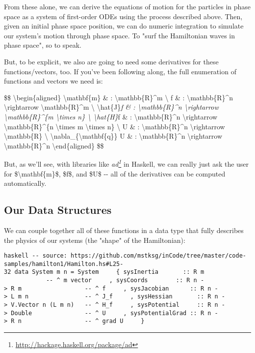 \documentclass[]{article}
\renewcommand{\href}[2]{#2\footnote{\url{#1}}}
\begin{document}
From these alone, we can derive the equations of motion for the particles in
phase space as a system of first-order ODEs using the process described above.
Then, given an initial phase space position, we can do numeric integration to
simulate our system's motion through phase space. To "surf the Hamiltonian waves
in phase space", so to speak.

But, to be explicit, we also are going to need some derivatives for these
functions/vectors, too. If you've been following along, the full enumeration of
functions and vectors we need is:

\$\$ \textbackslash{}begin\{aligned\} \textbackslash{}mathbf\{m\} \& :
\textbackslash{}mathbb\{R\}\^{}m \textbackslash{} f \& :
\textbackslash{}mathbb\{R\}\^{}n \textbackslash{}rightarrow
\textbackslash{}mathbb\{R\}\^{}m \textbackslash{}
\textbackslash{}hat\{J\}\emph{f \& : \textbackslash{}mathbb\{R\}\^{}n
\textbackslash{}rightarrow \textbackslash{}mathbb\{R\}\^{}\{m
\textbackslash{}times n\} \textbackslash{} \textbackslash{}hat\{H\}}f \& :
\textbackslash{}mathbb\{R\}\^{}n \textbackslash{}rightarrow
\textbackslash{}mathbb\{R\}\^{}\{n \textbackslash{}times m \textbackslash{}times
n\} \textbackslash{} U \& : \textbackslash{}mathbb\{R\}\^{}n
\textbackslash{}rightarrow \textbackslash{}mathbb\{R\} \textbackslash{}
\textbackslash{}nabla\_\{\textbackslash{}mathbf\{q\}\} U \& :
\textbackslash{}mathbb\{R\}\^{}n \textbackslash{}rightarrow
\textbackslash{}mathbb\{R\}\^{}n \textbackslash{}end\{aligned\} \$\$

But, as we'll see, with libraries like
\emph{\href{http://hackage.haskell.org/package/ad}{ad}} in Haskell, we can
really just ask the user for \$\textbackslash{}mathbf\{m\}\$, \$f\$, and \$U\$
-\/- all of the derivatives can be computed automatically.

\subsection{Our Data Structures}

We can couple together all of these functions in a data type that fully
describes the physics of our systems (the "shape" of the Hamiltonian):

\texttt{haskell\ -\/-\ source:\ https://github.com/mstksg/inCode/tree/master/code-samples/hamilton1/Hamilton.hs\#L25-32\ data\ System\ m\ n\ =\ System\ \ \ \ \ \{\ sysInertia\ \ \ \ \ \ \ ::\ R\ m\ \ \ \ \ \ \ \ \ \ \ \ \ \ \ \ \ \ \ \ \ \ \ \ \ -\/-\ \^{}\ \textquotesingle{}m\textquotesingle{}\ vector\ \ \ \ \ ,\ sysCoords\ \ \ \ \ \ \ \ ::\ R\ n\ -\textgreater{}\ R\ m\ \ \ \ \ \ \ \ \ \ \ \ \ \ \ \ \ \ -\/-\ \^{}\ f\ \ \ \ \ ,\ sysJacobian\ \ \ \ \ \ ::\ R\ n\ -\textgreater{}\ L\ m\ n\ \ \ \ \ \ \ \ \ \ \ \ \ \ \ \ -\/-\ \^{}\ J\_f\ \ \ \ \ ,\ sysHessian\ \ \ \ \ \ \ ::\ R\ n\ -\textgreater{}\ V.Vector\ n\ (L\ m\ n)\ \ \ -\/-\ \^{}\ H\_f\ \ \ \ \ ,\ sysPotential\ \ \ \ \ ::\ R\ n\ -\textgreater{}\ Double\ \ \ \ \ \ \ \ \ \ \ \ \ \ \ -\/-\ \^{}\ U\ \ \ \ \ ,\ sysPotentialGrad\ ::\ R\ n\ -\textgreater{}\ R\ n\ \ \ \ \ \ \ \ \ \ \ \ \ \ \ \ \ \ -\/-\ \^{}\ grad\ U\ \ \ \ \ \}}
\end{document}
